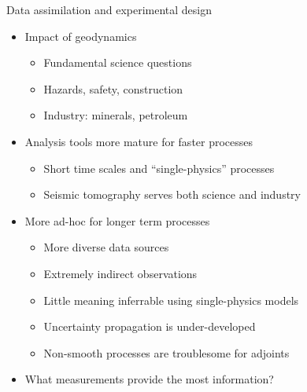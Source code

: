 \documentclass{beamer}
\begin{document}
\begin{frame}{Data assimilation and experimental design}
  \begin{itemize}
  \item Impact of geodynamics
    \begin{itemize}
    \item Fundamental science questions
    \item Hazards, safety, construction
    \item Industry: minerals, petroleum
    \end{itemize}
  \item Analysis tools more mature for faster processes
    \begin{itemize}
    \item Short time scales and ``single-physics'' processes
    \item Seismic tomography serves both science and industry
    \end{itemize}
  \item More ad-hoc for longer term processes
    \begin{itemize}
    \item More diverse data sources
    \item Extremely indirect observations
    \item Little meaning inferrable using single-physics models
    \item Uncertainty propagation is under-developed
    \item Non-smooth processes are troublesome for adjoints
    \end{itemize}
  \item What measurements provide the most information?
  \end{itemize}  
\end{frame}

\end{document}
